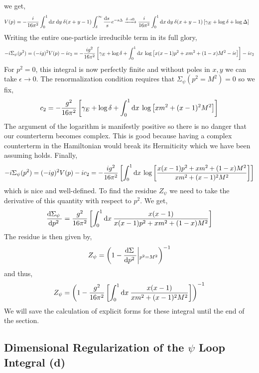 \documentclass[12pt]{extarticle}
\begin{document}
we get,
\begin{align*}
V(p) & = -\frac{i}{16 \pi^2} \int_{0}^{1} \mathrm{d}x \: \mathrm{d}y \: \delta(x + y - 1) \int_{\delta}^\infty \frac{\mathrm{d}s \:}{s} e^{ - s \Delta } \xrightarrow{\delta \to 0} \frac{i}{16 \pi^2} \int_{0}^{1} \mathrm{d}x \: \mathrm{d}y \:  \delta(x + y - 1) \left[ \gamma_E + \log{\delta} + \log{\Delta} \right]
\end{align*} 
Writing the entire one-particle irreducible term in its full glory,
\[ - i \Sigma_\psi(p^2) = (-ig)^2 V(p) - i c_2 = -\frac{ig^2}{16 \pi^2} \left[\gamma_E + \log{\delta} + \int_{0}^{1} \mathrm{d}x \: \log{\left[ x(x - 1) p^2 + x m^2 + (1 - x) M^2 - i \epsilon \right]} \right] - i c_2 \]
For $p^2 = 0$, this integral is now perfectly finite and without poles in $x, y$ we can take $\epsilon \to 0$. The renormalization condition requires that $\Sigma_\psi(p^2 = M^2) = 0$ so we fix,
\[ c_2 = -\frac{g^2}{16 \pi^2} \left[ \gamma_E + \log{\delta} + \int_{0}^{1} \mathrm{d}x \:   \log{\left[ x m^2 + (x - 1)^2 M^2 \right]} \right] \]
The argument of the logarithm is manifestly positive so there is no danger that our counterterm becomes complex. This is good because having a complex counterterm in the Hamiltonian would break its Hermiticity which we have been assuming holds.
Finally,
\[ - i \Sigma_\psi(p^2) = (-ig)^2 V(p) - i c_2 = -\frac{ig^2}{16 \pi^2} \left[ \int_{0}^{1} \mathrm{d}x \: \log{\left[\frac{ x(x - 1) p^2 + x m^2 + (1 - x) M^2}{x m^2 + (x - 1)^2 M^2} \right]} \right] \]
which is nice and well-defined. To find the residue $Z_\psi$ we need to take the derivative of this quantity with respect to $p^2$. We get,
\[ \frac{\mathrm{d}\Sigma_\psi \:}{\mathrm{d}p^2 \:} = \frac{g^2}{16 \pi^2} \left[ \int_{0}^{1} \mathrm{d}x \: \frac{x(x - 1)}{ x(x - 1) p^2 + x m^2 + (1 - x) M^2} \right] \] 
The residue is then given by,
\[ Z_\psi = \left(1 - \frac{\mathrm{d}\Sigma \:}{\mathrm{d}p^2 \:} \middle|_{p^2 = M^2} \right)^{-1}\]
and thus,
\[ Z_\psi = \left(1 -  \frac{g^2}{16 \pi^2} \left[ \int_{0}^{1} \mathrm{d}x \: \frac{x(x - 1)}{ x m^2 + (x - 1)^2 M^2} \right] \right)^{-1}\]
We will save the calculation of explicit forms for these integral until the end of the section.
 
\subsection{Dimensional Regularization of the $\psi$ Loop Integral (d)}
\end{document}
